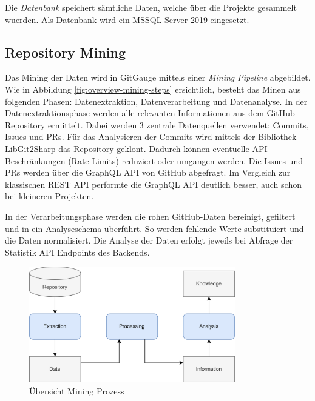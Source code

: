 Die \textit{Datenbank} speichert sämtliche Daten, welche über die Projekte gesammelt wuerden. Als Datenbank wird ein MSSQL Server 2019 eingesetzt. \parencite{grand_joel_vt1_joelgrand_repository_2024}

\subsection{Repository Mining}
Das Mining der Daten wird in GitGauge mittels einer \textit{Mining Pipeline} abgebildet. Wie in Abbildung \autoref{fig:overview-mining-steps} ersichtlich, besteht das Minen aus folgenden Phasen: Datenextraktion, Datenverarbeitung und Datenanalyse. 
In der Datenextraktionsphase werden alle relevanten Informationen aus dem GitHub Repository ermittelt. Dabei werden 3 zentrale Datenquellen verwendet: Commits, Issues und PRs. Für das Analysieren der Commits wird mittels der Bibliothek LibGit2Sharp das Repository geklont. Dadurch können eventuelle API-Beschränkungen (Rate Limits) reduziert oder umgangen werden. Die Issues und PRs werden über die GraphQL API von GitHub abgefragt. Im Vergleich zur klassischen REST API performte die GraphQL API deutlich besser, auch schon bei kleineren Projekten.  

In der Verarbeitungsphase werden die rohen GitHub-Daten bereinigt, gefiltert und in ein Analyseschema überführt. So werden fehlende Werte substituiert und die Daten normalisiert. 
Die Analyse der Daten erfolgt jeweils bei Abfrage der Statistik API Endpoints des Backends. 

\begin{figure}[htbp]
    \centering
    \includegraphics[width=0.8\textwidth]{Figures/uebersicht-mining-prozess.png}
    \caption{Übersicht Mining Prozess \parencite{grand_joel_vt1_joelgrand_repository_2024}}
    \label{fig:overview-mining-steps}
\end{figure}



